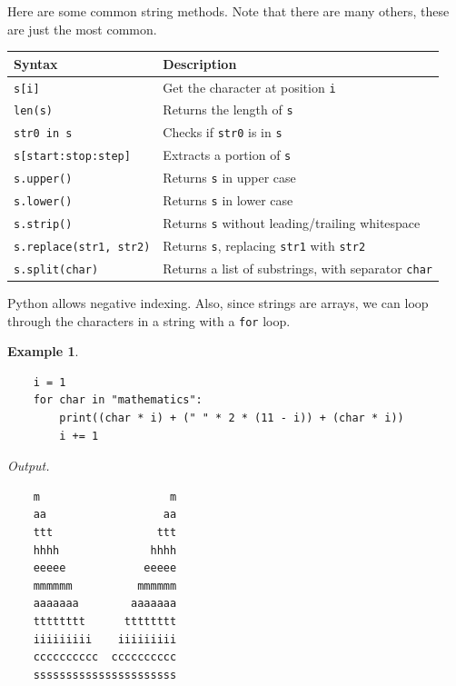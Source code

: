 \documentclass[11pt]{scrartcl}
\theoremstyle{definition}
\newtheorem*{example}{Example}
\begin{document}
Here are some common string methods. Note that there are many others, these are just the most common. 

\begin{center}
\begin{tabular}{|l|l|} \hline
    \textbf{Syntax} & \textbf{Description} \\ \hline
    \texttt{s[i]} & Get the character at position \texttt{i} \\ \hline
    \texttt{len(s)} & Returns the length of \texttt{s} \\ \hline
    \texttt{str0 in s} & Checks if \texttt{str0} is in \texttt{s} 
    \\ \hline
    \texttt{s[start:stop:step]} & Extracts a portion of \texttt{s} \\ \hline
    \texttt{s.upper()} & Returns \texttt{s} in upper case \\ \hline
    \texttt{s.lower()} & Returns \texttt{s} in lower case \\ \hline
    \texttt{s.strip()} & Returns \texttt{s} without leading/trailing whitespace \\ \hline
    \texttt{s.replace(str1, str2)} & Returns \texttt{s}, replacing 
    \texttt{str1} with \texttt{str2} \\ \hline
    \texttt{s.split(char)} & Returns a list of substrings, with separator \texttt{char} 
    \\ \hline
\end{tabular}
\end{center}

Python allows negative indexing. Also, since strings are arrays, we can loop through the characters in a string 
with a \texttt{for} loop.

\begin{example}
    \
\begin{verbatim}
    i = 1
    for char in "mathematics":
        print((char * i) + (" " * 2 * (11 - i)) + (char * i))
        i += 1
\end{verbatim}
\newpage %
    \textit{Output.}
\begin{verbatim} 
    m                    m
    aa                  aa
    ttt                ttt
    hhhh              hhhh
    eeeee            eeeee
    mmmmmm          mmmmmm
    aaaaaaa        aaaaaaa
    tttttttt      tttttttt
    iiiiiiiii    iiiiiiiii
    cccccccccc  cccccccccc
    ssssssssssssssssssssss
\end{verbatim} 
\end{example}
\end{document}
